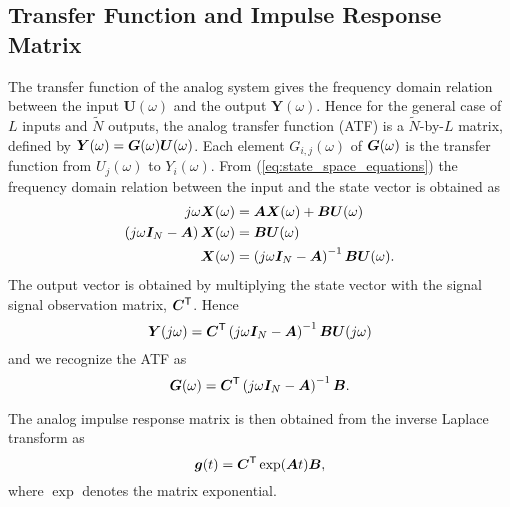 \subsection{Transfer Function and Impulse Response Matrix}
The transfer function of the analog system gives the frequency domain relation between the input $\bm{U}(\omega)$ and the output $\bm{Y}(\omega)$. Hence for the general case of $L$ inputs and $\tilde{N}$ outputs, the analog transfer function (ATF) is a $\tilde{N}$-by-$L$ matrix, defined by $\bm{Y}(\omega) = \bm{G}(\omega) \bm{U}(\omega)$. Each element $G_{i,j}(\omega)$ of $\bm{G}(\omega)$ is the transfer function from $U_j(\omega)$ to $Y_i(\omega)$. From (\ref{eq:state_space_equations}) the frequency domain relation between the input and the state vector is obtained as
\begin{align}
    j\omega \bm{X}(\omega) &= \bm{A} \bm{X}(\omega) + \bm{B}\bm{U}(\omega) \\
    \left(j\omega \bm{I}_{N} - \bm{A} \right)  \bm{X}(\omega) &=  \bm{B}\bm{U}(\omega) \\
    \bm{X}(\omega) &= \left(j\omega \bm{I}_{N} - \bm{A} \right)^{-1}\bm{B}\bm{U}(\omega).
\end{align}
The output vector is obtained by multiplying the state vector with the signal signal observation matrix, $\bm{C}^\mathsf{T}$. Hence
\begin{equation}
    \bm{Y}(j\omega) = \bm{C}^\mathsf{T}\left(j\omega \bm{I}_{N} - \bm{A} \right)^{-1}\bm{B}\bm{U}(j\omega)
\end{equation}
and we recognize the ATF as
\begin{equation}
    \bm{G}(\omega) = \bm{C}^\mathsf{T}\left(j\omega \bm{I}_{N} - \bm{A} \right)^{-1}\bm{B}.
\end{equation}

The analog impulse response matrix is then obtained from the inverse Laplace transform as
\begin{equation}
    \bm{g}(t) = \bm{C}^\mathsf{T} \exp(\bm{A} t) \bm{B},
\end{equation}
where $\exp$ denotes the matrix exponential.






























